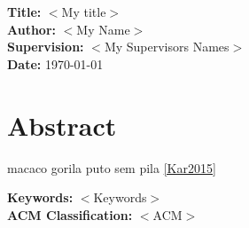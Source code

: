 \documentclass[11pt,a4paper]{article}
\newcommand{\dummy}[1]{$<$#1$>$}
\newcommand{\titles}[2]{\noindent\textbf{#1:} #2\\[2mm]}
\begin{document}
\titles{Title}{\dummy{My title}}
\titles{Author}{\dummy{My Name}}
\titles{Supervision}{\dummy{My Supervisors Names}}
\titles{Date}{\today}

\section*{Abstract}

macaco gorila puto sem pila
\ref{Kar2015}


\lipsum[10-12]

\titles{Keywords}{\dummy{Keywords}}
\titles{ACM Classification}{\dummy{ACM}}

\nocite{*}  %



\end{document}

